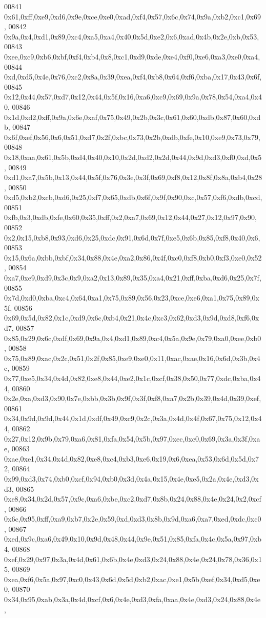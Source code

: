 \begin{DoxyCode}
00841   0x61,0xff,0xe9,0xd6,0x9e,0xce,0xe0,0xad,0xf4,0x57,0x6c,0x74,0x9a,0xb2,0xc1,0x69,
00842   0x9a,0x4,0xd1,0x89,0xc4,0xa5,0xa4,0x40,0x5d,0xe2,0x6,0xad,0x4b,0x2e,0xb,0x53,
00843   0xee,0xc9,0xb6,0xbf,0xf4,0xb4,0x8,0xc1,0xd9,0xde,0xe4,0xf0,0xe6,0xa3,0xe0,0xa4,
00844   0xd,0xd5,0x4e,0x76,0xc2,0x8a,0x39,0xea,0xf4,0xb8,0x64,0xf6,0xba,0x17,0x43,0x6f,
00845   0x12,0x44,0x57,0xd7,0x12,0x44,0x5f,0x16,0xa6,0xc9,0x69,0x9a,0x78,0x54,0xa4,0x40,
00846   0x1d,0xd2,0xff,0x9a,0x6e,0xaf,0x75,0x49,0x2b,0x3c,0x61,0x60,0xdb,0x87,0x60,0xdb,
00847   0x6f,0xef,0x56,0x6,0x51,0xd7,0x2f,0xbc,0x73,0x2b,0xdb,0xfe,0x10,0xe9,0x73,0x79,
00848   0x18,0xaa,0x61,0x5b,0xd4,0x40,0x10,0x2d,0xd2,0x2d,0x44,0x9d,0xd3,0xf0,0xd,0x5,
00849   0xd1,0xa7,0x5b,0x13,0x44,0x5f,0x76,0x3e,0x3f,0x69,0xf8,0x12,0x8f,0x8a,0xb4,0x28,
00850   0xd5,0xb2,0xcb,0xd6,0x25,0xf7,0x65,0xdb,0x6f,0x9f,0x90,0xc,0x57,0xf6,0xdb,0xcd,
00851   0xfb,0x3,0xdb,0xfe,0x60,0x35,0xff,0x2,0xa7,0x69,0x12,0x44,0x27,0x12,0x97,0x90,
00852   0x2,0x15,0xb8,0x93,0xd6,0x25,0xdc,0x91,0x6d,0x7f,0xe5,0x6b,0x85,0xf8,0x40,0x6,
00853   0x15,0x6a,0xbb,0xbf,0x34,0x88,0x4e,0xa2,0x86,0x4f,0xc0,0xf8,0xb0,0xf3,0xe0,0x52,
00854   0xa7,0xe9,0xd9,0x3c,0x9,0xa2,0x13,0x89,0x35,0xa4,0x21,0xff,0xba,0xd6,0x25,0x7f,
00855   0x7d,0xd0,0xba,0xc4,0x64,0xa1,0x75,0x89,0x56,0x23,0xce,0xe6,0xa1,0x75,0x89,0x5f,
00856   0x69,0x5d,0x82,0x1c,0xd9,0x6c,0xb4,0x21,0x4c,0xc3,0x62,0xd3,0x9d,0xd8,0xf6,0xd7,
00857   0x85,0x29,0x6c,0xdf,0x69,0x9a,0x4,0xd1,0x89,0xc4,0x5a,0x9e,0x79,0xa0,0xee,0xb0,
00858   0x75,0x89,0xac,0x2c,0x51,0x2f,0x85,0xe9,0xe0,0x11,0xac,0xae,0x16,0x6d,0x3b,0x4c,
00859   0x77,0xe5,0x34,0x4d,0x82,0xe8,0x44,0xe2,0x1c,0xcf,0x38,0x50,0x77,0xdc,0xba,0x44,
00860   0x2e,0xa,0xd3,0x90,0x7e,0xbb,0x3b,0x9f,0x3f,0xf8,0xa7,0x2b,0x39,0x4d,0x39,0xef,
00861   0x34,0x9d,0x9d,0x44,0x1d,0xdf,0x49,0xc9,0x2c,0x3a,0x4d,0x4f,0x67,0x75,0x12,0x44,
00862   0x27,0x12,0x9b,0x79,0xa6,0x81,0xfa,0x54,0x5b,0x97,0xec,0xc0,0x69,0x3a,0x3f,0xae,
00863   0xae,0xe1,0x34,0x4d,0x82,0xe8,0xc4,0xb3,0xe6,0x19,0x6,0xea,0x53,0x6d,0x5d,0x72,
00864   0x99,0xd3,0x74,0xb0,0xcf,0x94,0xb0,0x3d,0x4a,0x15,0x4e,0xe5,0x2a,0x4e,0xd3,0xd3,
00865   0xe8,0x34,0x2d,0x57,0x9c,0xa6,0xbe,0xc2,0xd7,0x8b,0x24,0x88,0x4e,0x24,0x2,0xcf,
00866   0x6c,0x95,0xff,0xa9,0xb7,0x2e,0x59,0xd,0xd3,0x8b,0x9d,0xa6,0xa7,0xed,0xdc,0xc0,
00867   0xed,0x9c,0xa6,0x49,0x10,0x9d,0x48,0x44,0x9e,0x51,0x85,0xfa,0x4c,0x5a,0x97,0xb4,
00868   0xef,0x29,0x97,0x3a,0x4d,0x61,0x6b,0x4e,0xd3,0x24,0x88,0x4e,0x24,0x78,0x36,0x15,
00869   0xea,0xf6,0x5a,0x97,0xc0,0x43,0x6d,0x5d,0xb2,0xac,0xe1,0x5b,0xef,0x34,0xd5,0xe0,
00870   0x34,0x95,0xab,0x3a,0x4d,0xcf,0x6,0x4e,0xd3,0xfa,0xaa,0x4e,0xd3,0x24,0x88,0x4e,

\end{DoxyCode}
